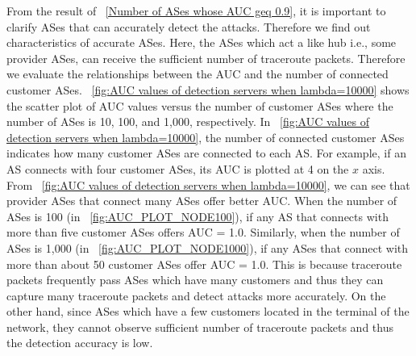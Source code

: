 \documentclass[conference]{IEEEtran}
\begin{document}
    From the result of \figurename~\ref{Number of ASes whose AUC geq 0.9}, it is important to clarify ASes that can accurately detect the attacks.
    Therefore we find out characteristics of accurate ASes.
    Here, the ASes which act a like hub i.e., some provider ASes, can receive the sufficient number of traceroute packets.
    Therefore we evaluate the relationships between the AUC and the number of connected customer ASes.
    \figurename~\ref{fig:AUC values of detection servers when lambda=10000} shows the scatter plot of AUC values versus the number of customer ASes where the number of ASes is 10, 100, and 1,000, respectively.
    In \figurename~\ref{fig:AUC values of detection servers when lambda=10000}, the number of connected customer ASes indicates how many customer ASes are connected to each AS.
    For example, if an AS connects with four customer ASes, its AUC is plotted at 4 on the $x$ axis.
    From \figurename~\ref{fig:AUC values of detection servers when lambda=10000}, we can see that provider ASes that connect many ASes offer better AUC.
    When the number of ASes is 100 (in \figurename~\ref{fig:AUC_PLOT_NODE100}), if any AS that connects with more than five customer ASes offers AUC = 1.0.
    Similarly, when the number of ASes is 1,000 (in \figurename~\ref{fig:AUC_PLOT_NODE1000}), if any ASes that connect with more than about 50 customer ASes offer AUC = 1.0.
    This is because traceroute packets frequently pass ASes which have many customers and thus they can capture many traceroute packets and detect attacks more accurately.
    On the other hand, since ASes which have a few customers located in the terminal of the network, they cannot observe sufficient number of traceroute packets and thus the detection accuracy is low.
\end{document}
